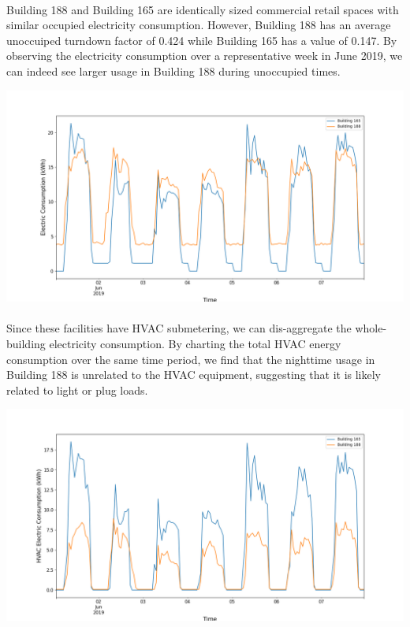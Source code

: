 \documentclass[a4paper]{article}
\begin{document}
\paragraph{}
Building 188 and Building 165 are identically sized commercial retail spaces with similar occupied electricity consumption. However, Building 188 has an average unoccuiped turndown factor of 0.424 while Building 165 has a value of 0.147. By observing the electricity consumption over a representative week in June 2019, we can indeed see larger usage in Building 188 during unoccupied times.

\includegraphics[width=.9\columnwidth]{./images/188v165_Turndown.png}

\paragraph{}
Since these facilities have HVAC submetering, we can dis-aggregate the whole-building electricity consumption. By charting the total HVAC energy consumption over the same time period, we find that the nighttime usage in Building 188 is unrelated to the HVAC equipment, suggesting that it is likely related to light or plug loads.

\includegraphics[width=.9\columnwidth]{./images/188v165_Turndown_HVAC.png}
\end{document}
